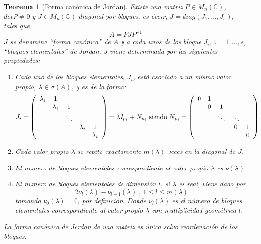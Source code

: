 \documentclass[size=a4, parskip=half, titlepage=false, toc=flat, toc=bib, 12pt]{scrartcl}
\theoremstyle{theorem-style}
\newtheorem{nth}{Teorema}[section]
\theoremstyle{definition-style}
\theoremstyle{remark-style}
\theoremstyle{example-style}
\theoremstyle{definition-style}
\theoremstyle{remark-style}
\begin{document}
\begin{nth}[Forma canónica de Jordan]
Existe una matriz $P \in M_n(\mathbb{C})$, $det P \neq 0$ y $J \in M_n(\mathbb{C})$ diagonal por bloques, es decir, $J = diag(J_1, \dots, J_s)$, tales que
$$A = P J P^{-1} $$
$J$ se denomina ``forma canónica'' de $A$ y a cada unos de los bloque $J_i$, $i = 1, \dots, s$,  ``bloques elementales'' de Jordan. $J$ viene determinada por las siguientes propiedades:
\begin{enumerate}
\item Cada uno de los bloques elementales, $J_i$, está asociado a un mismo valor propio, $\lambda \in \sigma(A)$, y es de la forma:
$$J_i = \left(
      \begin{array}{{ccccc}}
        \lambda_i   &   1       &         &    & \\
              &    \lambda_i    &    1     &    & \\
              &           & \ddots  &     & \\
              &           &         & \lambda_i & 1 \\
              &           &         &           & \lambda_i
      \end{array}
\right) = \lambda I_{p_i} + N_{p_i} \textrm{ siendo } N_{p_i} = \left(
      \begin{array}{{ccccc}}
            0   &   1       &         &    & \\
              &    0    &    1     &    & \\
              &           & \ddots  &  \ddots   & \\
              &           &         & 0 & 1 \\
              &           &         &           & 0
      \end{array}
\right)$$
\item Cada valor propio $\lambda$ se repite exactamente $m(\lambda)$ veces en la diagonal de $J$.
\item El número de bloques elementales correspondiente al valor propio $\lambda$ es $\nu(\lambda)$.
\item El número de bloques elementales de dimensión $l$, si $\lambda$ es real, viene dado por
$$2 \nu_l(\lambda) - \nu_{l-1}(\lambda) \textrm{ , } 1 \leq l \leq m(\lambda)$$
tomando $\nu_0(\lambda) = 0$, por definición. Donde $\nu_l(\lambda)$ es el número de bloques elementales correspondiente al valor propio $\lambda$ con multiplicidad geométrica $l$.
\end{enumerate}
La forma canónica de Jordan de una matriz es única salvo reordenación de los bloques.
\end{nth}
\end{document}
